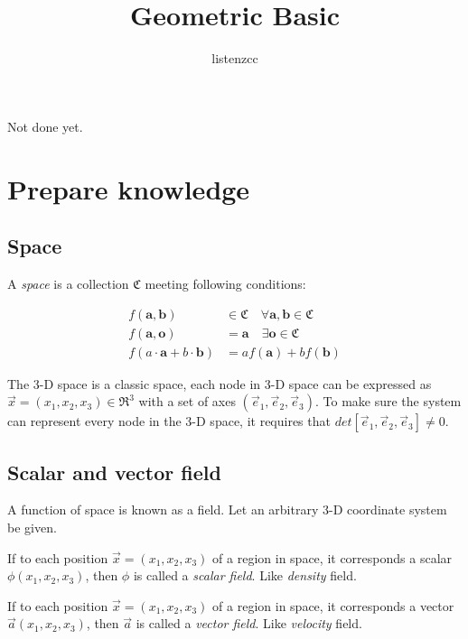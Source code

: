 \documentclass[a4paper]{article}
\title{Geometric Basic}
\author{listenzcc}
\begin{document}
\maketitle

\abstract
Not done yet.

\tableofcontents

\section{Prepare knowledge}
\subsection{Space}
A \emph{space} is a collection $\mathfrak{C}$ meeting following conditions:

\begin{equation}
    \begin{aligned}
        f(\mathbf{a}, \mathbf{b})                  & \in \mathfrak{C} \quad \forall \mathbf{a}, \mathbf{b} \in \mathfrak{C} \\
        f(\mathbf{a}, \mathbf{o})                  & = \mathbf{a} \quad \exists \mathbf{o} \in \mathfrak{C}                 \\
        f(a \cdot \mathbf{a} + b \cdot \mathbf{b}) & = a f(\mathbf{a}) + b f(\mathbf{b})
    \end{aligned}
\end{equation}

The 3-D space is a classic space, each node in 3-D space can be expressed as $\vec{x} = (x_{1}, x_{2}, x_{3}) \in \mathfrak{R}^{3} $ with a set of axes $(\vec{e}_{1}, \vec{e}_{2}, \vec{e}_{3})$.
To make sure the system can represent every node in the 3-D space, it requires that $det[\vec{e}_{1}, \vec{e}_{2}, \vec{e}_{3}] \neq 0$.

\subsection{Scalar and vector field}
A function of space is known as a field.
Let an arbitrary 3-D coordinate system be given.

If to each position $\vec{x} = (x_{1}, x_{2}, x_{3})$ of a region in space, it corresponds a scalar $\phi (x_{1}, x_{2}, x_{3})$, then $\phi$ is called a \emph{scalar field}.
Like \emph{density} field.

If to each position $\vec{x} = (x_{1}, x_{2}, x_{3})$ of a region in space, it corresponds a vector $\vec{a} (x_{1}, x_{2}, x_{3})$, then $\vec{a}$ is called a \emph{vector field}.
Like \emph{velocity} field.
\end{document}

